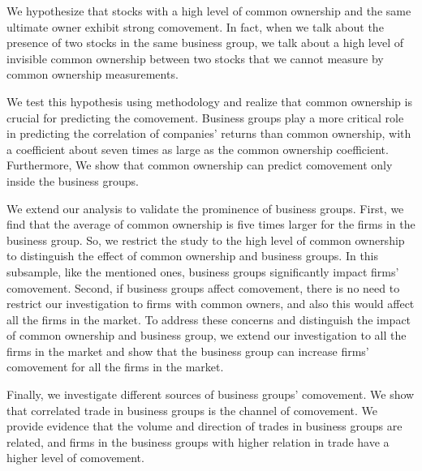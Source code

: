 We hypothesize that stocks with a high level of common ownership and the same ultimate owner exhibit strong comovement. In fact, when we talk about the presence of two stocks in the same business group, we talk about a high level of invisible common ownership between two stocks that we cannot measure by common ownership measurements. 

We test this hypothesis using \cite{AntonPolk} methodology and realize that common ownership is crucial for predicting the comovement. Business groups play a more critical role in predicting the correlation of companies' returns than common ownership, with a coefficient about seven times as large as the common ownership coefficient. Furthermore, We show that common ownership can predict comovement only inside the business groups.



We extend our analysis to validate the prominence of business groups. First, we find that the average of common ownership is five times larger for the firms in the business group. So, we restrict the study to the high level of common ownership to distinguish the effect of common ownership and business groups. In this subsample, like the mentioned ones, business groups significantly impact firms' comovement. Second, if business groups affect comovement, there is no need to restrict our investigation to firms with common owners, and also this would affect all the firms in the market. To address these concerns and distinguish the impact of common ownership and business group, we extend our investigation to all the firms in the market and show that the business group can increase firms' comovement for all the firms in the market. 
	
{Finally, we investigate different sources of business groups' comovement. We show that correlated trade in business groups is the channel of comovement. We provide evidence that the volume and direction of trades in business groups are related, and firms in the business groups with higher relation in trade have a higher level of comovement.}
	
	

%